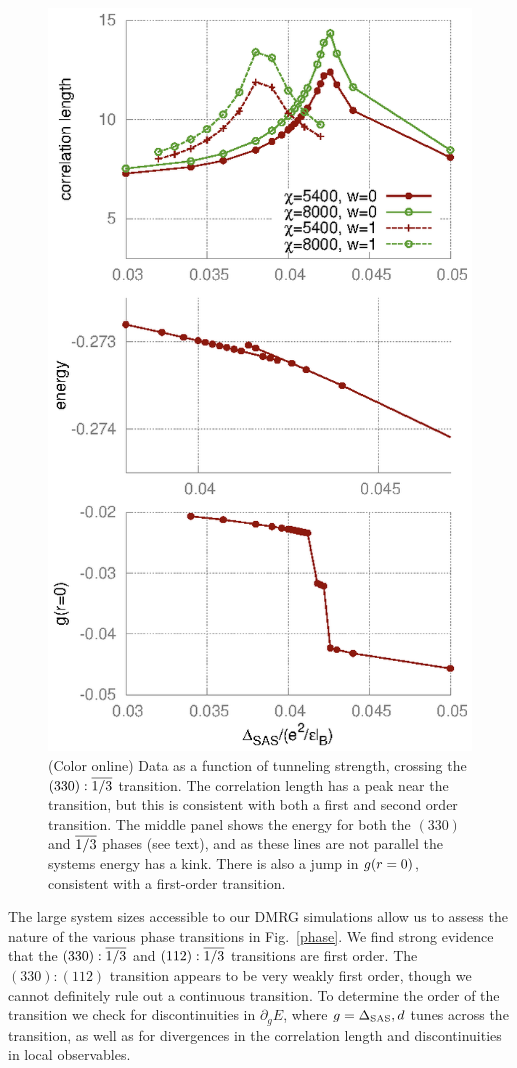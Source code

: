 \begin{figure}[ttt]
	\includegraphics[width=0.6\linewidth]{figures/B.eps}
	\caption{\label{Bplots} (Color online) Data as a function of tunneling strength, crossing the $(330):\overline{1/3}$ transition. The correlation length has a peak near the transition, but this is consistent with both a first and second order transition. The middle panel shows the energy for both the $(330)$ and $\overline{1/3}$ phases (see text), and as these lines are not parallel the systems energy has a kink. There is also a jump in ${g}(r=0)$, consistent with a first-order transition. }
\end{figure}

The large system sizes accessible to our DMRG simulations allow us to assess the nature of the various phase transitions in Fig.~\ref{phase}. 
We find strong evidence that the $(330):\overline{1/3}$ and $ (112):\overline{1/3}$ transitions are first order. The $(330):(112)$ transition appears to be very weakly first order, though we cannot definitely rule out a continuous transition.
To determine the order of the transition we check for discontinuities in $\partial_g E$, where $g = \Delta_\textrm{SAS}, d$ tunes across the transition, as well as for divergences in the correlation length and discontinuities in local observables.


